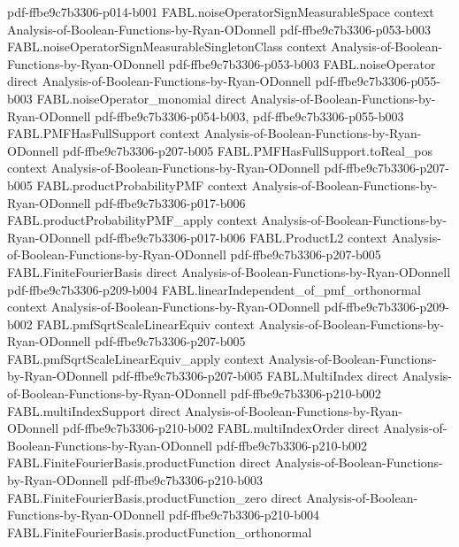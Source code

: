 \begin{theorem}
  {pdf-ffbe9c7b3306-p014-b001}
\proofstep
  {FABL.noiseOperatorSignMeasurableSpace}
  {context}
  {Analysis-of-Boolean-Functions-by-Ryan-ODonnell}
  {pdf-ffbe9c7b3306-p053-b003}
\proofstep
  {FABL.noiseOperatorSignMeasurableSingletonClass}
  {context}
  {Analysis-of-Boolean-Functions-by-Ryan-ODonnell}
  {pdf-ffbe9c7b3306-p053-b003}
\proofstep
  {FABL.noiseOperator}
  {direct}
  {Analysis-of-Boolean-Functions-by-Ryan-ODonnell}
  {pdf-ffbe9c7b3306-p055-b003}
\proofstep
  {FABL.noiseOperator_monomial}
  {direct}
  {Analysis-of-Boolean-Functions-by-Ryan-ODonnell}
  {pdf-ffbe9c7b3306-p054-b003,
    pdf-ffbe9c7b3306-p055-b003}
\proofstep
  {FABL.PMFHasFullSupport}
  {context}
  {Analysis-of-Boolean-Functions-by-Ryan-ODonnell}
  {pdf-ffbe9c7b3306-p207-b005}
\proofstep
  {FABL.PMFHasFullSupport.toReal_pos}
  {context}
  {Analysis-of-Boolean-Functions-by-Ryan-ODonnell}
  {pdf-ffbe9c7b3306-p207-b005}
\proofstep
  {FABL.productProbabilityPMF}
  {context}
  {Analysis-of-Boolean-Functions-by-Ryan-ODonnell}
  {pdf-ffbe9c7b3306-p017-b006}
\proofstep
  {FABL.productProbabilityPMF_apply}
  {context}
  {Analysis-of-Boolean-Functions-by-Ryan-ODonnell}
  {pdf-ffbe9c7b3306-p017-b006}
\proofstep
  {FABL.ProductL2}
  {context}
  {Analysis-of-Boolean-Functions-by-Ryan-ODonnell}
  {pdf-ffbe9c7b3306-p207-b005}
\proofstep
  {FABL.FiniteFourierBasis}
  {direct}
  {Analysis-of-Boolean-Functions-by-Ryan-ODonnell}
  {pdf-ffbe9c7b3306-p209-b004}
\proofstep
  {FABL.linearIndependent_of_pmf_orthonormal}
  {context}
  {Analysis-of-Boolean-Functions-by-Ryan-ODonnell}
  {pdf-ffbe9c7b3306-p209-b002}
\proofstep
  {FABL.pmfSqrtScaleLinearEquiv}
  {context}
  {Analysis-of-Boolean-Functions-by-Ryan-ODonnell}
  {pdf-ffbe9c7b3306-p207-b005}
\proofstep
  {FABL.pmfSqrtScaleLinearEquiv_apply}
  {context}
  {Analysis-of-Boolean-Functions-by-Ryan-ODonnell}
  {pdf-ffbe9c7b3306-p207-b005}
\proofstep
  {FABL.MultiIndex}
  {direct}
  {Analysis-of-Boolean-Functions-by-Ryan-ODonnell}
  {pdf-ffbe9c7b3306-p210-b002}
\proofstep
  {FABL.multiIndexSupport}
  {direct}
  {Analysis-of-Boolean-Functions-by-Ryan-ODonnell}
  {pdf-ffbe9c7b3306-p210-b002}
\proofstep
  {FABL.multiIndexOrder}
  {direct}
  {Analysis-of-Boolean-Functions-by-Ryan-ODonnell}
  {pdf-ffbe9c7b3306-p210-b002}
\proofstep
  {FABL.FiniteFourierBasis.productFunction}
  {direct}
  {Analysis-of-Boolean-Functions-by-Ryan-ODonnell}
  {pdf-ffbe9c7b3306-p210-b003}
\proofstep
  {FABL.FiniteFourierBasis.productFunction_zero}
  {direct}
  {Analysis-of-Boolean-Functions-by-Ryan-ODonnell}
  {pdf-ffbe9c7b3306-p210-b004}
\proofstep
  {FABL.FiniteFourierBasis.productFunction_orthonormal}

\end{theorem}

